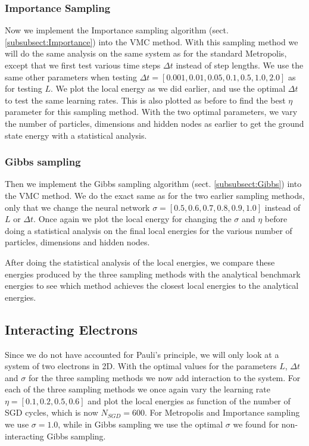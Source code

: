 \documentclass[12pt,a4paper,english]{article}
\begin{document}
\subsubsection{Importance Sampling}
\label{subsubsect:Method_Nonint_Importance}
Now we implement the Importance sampling algorithm (sect. \ref{subsubsect:Importance}) into the VMC method. With this sampling method we will do the same analysis on the same system as for the standard Metropolis, except that we first test various time steps $\Delta t$ instead of step lengths. We use the same other parameters when testing $\Delta t=[0.001,0.01,0.05,0.1,0.5,1.0,2.0]$ as for testing $L$. We plot the local energy as we did earlier, and use the optimal $\Delta t$ to test the same learning rates. This is also plotted as before to find the best $\eta$ parameter for this sampling method. With the two optimal parameters, we vary the number of particles, dimensions and hidden nodes as earlier to get the ground state energy with a statistical analysis.

\subsubsection{Gibbs sampling}
\label{subsubsect:Method_Nonint_Gibbs}
Then we implement the Gibbs sampling algorithm (sect. \ref{subsubsect:Gibbs}) into the VMC method. We do the exact same as for the two earlier sampling methods, only that we change the neural network $\sigma=[0.5, 0.6, 0.7, 0.8, 0.9, 1.0]$ instead of $L$ or $\Delta t$. Once again we plot the local energy for changing the $\sigma$ and $\eta$ before doing a statistical analysis on the final local energies for the various number of particles, dimensions and hidden nodes.

After doing the statistical analysis of the local energies, we compare these energies produced by the three sampling methods with the analytical benchmark energies to see which method achieves the closest local energies to the analytical energies.

\subsection{Interacting Electrons}
\label{subsect:Method_int}
Since we do not have accounted for Pauli's principle, we will only look at a system of two electrons in 2D. With the optimal values for the parameters $L$, $\Delta t$ and $\sigma$ for the three sampling methods we now add interaction to the system. For each of the three sampling methods we once again vary the learning rate $\eta=[0.1,0.2,0.5,0.6]$ and plot the local energies as function of the number of SGD cycles, which is now $N_{SGD}=600$. For Metropolis and Importance sampling we use $\sigma=1.0$, while in Gibbs sampling we use the optimal $\sigma$ we found for non-interacting Gibbs sampling.
\end{document}
